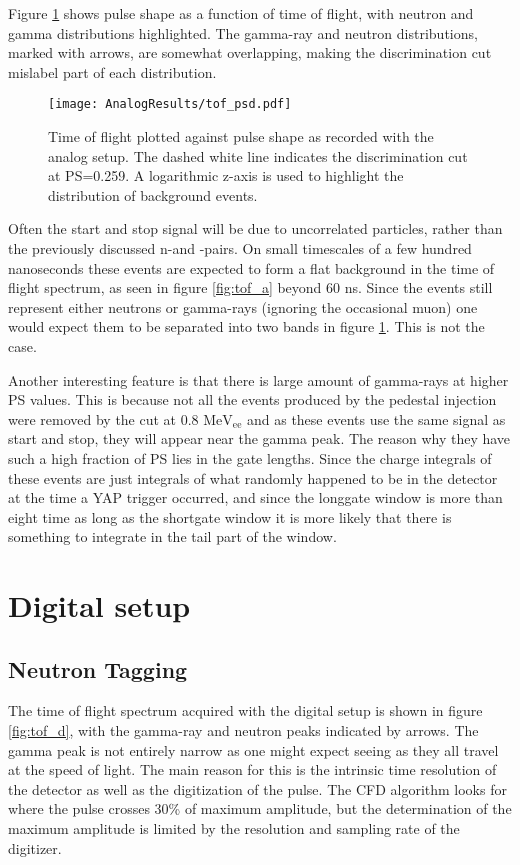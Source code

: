 \documentclass[main.tex]{subfiles}
\begin{document}
Figure \ref{fig:tof_ps_a} shows pulse shape as a function of time of flight, with neutron and gamma distributions highlighted. The gamma-ray and neutron distributions, marked with arrows, are somewhat overlapping, making the discrimination cut mislabel part of each distribution.

\begin{figure}[ht]
    \centering
        \texttt{[image: AnalogResults/tof\_psd.pdf]}
        \caption[Heat map of pulse shape as a function of time of flight.]{Time of flight plotted against pulse shape as recorded with the analog setup. The dashed white line indicates the discrimination cut at PS=0.259. A logarithmic z-axis is used to highlight the distribution of background events.}
    \label{fig:tof_ps_a} 
\end{figure}


Often the start and stop signal will be due to uncorrelated particles, rather than the previously discussed n-\textgamma and \textgamma-\textgamma pairs. On small timescales of a few hundred nanoseconds these events are expected to form a flat background in the time of flight spectrum, as seen in figure \ref{fig:tof_a} beyond 60 ns. Since the events still represent either neutrons or gamma-rays (ignoring the occasional muon) one would expect them to be separated into two bands in figure \ref{fig:tof_ps_a}. This is not the case.

Another interesting feature is that there is large amount of gamma-rays at higher PS values. This is because not all the events produced by the pedestal injection were removed by the cut at 0.8 $\text{MeV}_\text{ee}$ and as these events use the same signal as start and stop, they will appear near the gamma peak. The reason why they have such a high fraction of PS lies in the gate lengths. Since the charge integrals of these events are just integrals of what randomly happened to be in the detector at the time a YAP trigger occurred, and since the longgate window is more than eight time as long as the shortgate window it is more likely that there is something to integrate in the tail part of the window.



\section{Digital setup}

\subsection{Neutron Tagging}
The time of flight spectrum acquired with the digital setup is shown in figure \ref{fig:tof_d}, with the gamma-ray and neutron peaks indicated by arrows. The gamma peak is not entirely narrow as one might expect seeing as they all travel at the speed of light. The main reason for this is the intrinsic time resolution of the detector as well as the digitization of the pulse. The CFD algorithm looks for where the pulse crosses 30\% of maximum amplitude, but the determination of the maximum amplitude is limited by the resolution and sampling rate of the digitizer.
\end{document}
